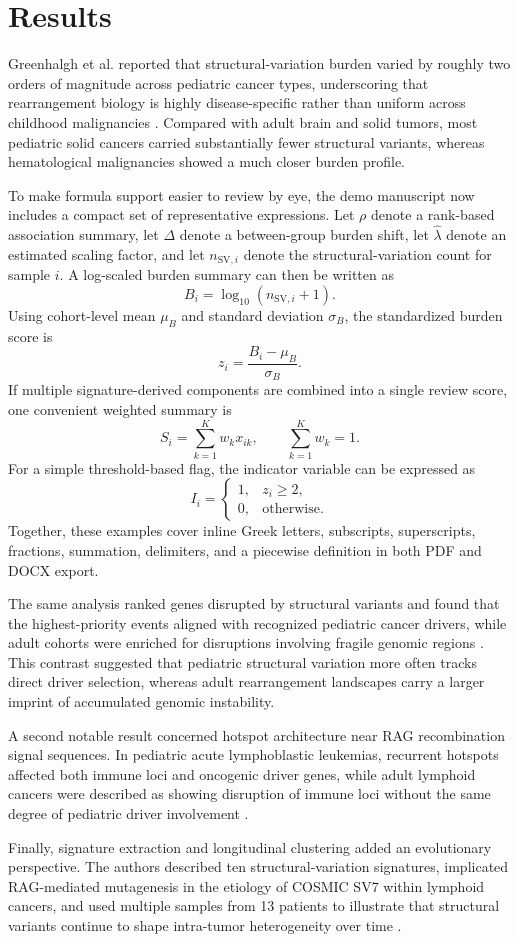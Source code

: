 \section{Results}
Greenhalgh et al. reported that structural-variation burden varied by
roughly two orders of magnitude across pediatric cancer types,
underscoring that rearrangement biology is highly disease-specific
rather than uniform across childhood malignancies \supercite{Greenhalgh_2026}.
Compared with adult brain and solid tumors, most pediatric solid cancers
carried substantially fewer structural variants, whereas hematological
malignancies showed a much closer burden profile.

To make formula support easier to review by eye, the demo manuscript now
includes a compact set of representative expressions. Let $\rho$ denote
a rank-based association summary, let $\Delta$ denote a between-group
burden shift, let $\hat{\lambda}$ denote an estimated scaling factor,
and let $n_{\mathrm{SV},i}$ denote the structural-variation count for
sample $i$. A log-scaled burden summary can then be written as
\[
B_i = \log_{10}\!\left(n_{\mathrm{SV},i} + 1\right).
\]
Using cohort-level mean $\mu_B$ and standard deviation $\sigma_B$, the
standardized burden score is
\[
z_i = \frac{B_i - \mu_B}{\sigma_B}.
\]
If multiple signature-derived components are combined into a single
review score, one convenient weighted summary is
\[
S_i = \sum_{k=1}^{K} w_k x_{ik},
\qquad
\sum_{k=1}^{K} w_k = 1.
\]
For a simple threshold-based flag, the indicator variable can be
expressed as
\[
I_i =
\left\{
\begin{array}{ll}
1, & z_i \geq 2, \\
0, & \mathrm{otherwise}.
\end{array}
\right.
\]
Together, these examples cover inline Greek letters, subscripts,
superscripts, fractions, summation, delimiters, and a piecewise
definition in both PDF and DOCX export.

The same analysis ranked genes disrupted by structural variants and
found that the highest-priority events aligned with recognized pediatric
cancer drivers, while adult cohorts were enriched for disruptions
involving fragile genomic regions \supercite{Greenhalgh_2026}. This contrast suggested
that pediatric structural variation more often tracks direct driver
selection, whereas adult rearrangement landscapes carry a larger imprint
of accumulated genomic instability.

A second notable result concerned hotspot architecture near RAG
recombination signal sequences. In pediatric acute lymphoblastic
leukemias, recurrent hotspots affected both immune loci and oncogenic
driver genes, while adult lymphoid cancers were described as showing
disruption of immune loci without the same degree of pediatric driver
involvement \supercite{Greenhalgh_2026}.

Finally, signature extraction and longitudinal clustering added an
evolutionary perspective. The authors described ten structural-variation
signatures, implicated RAG-mediated mutagenesis in the etiology of
COSMIC SV7 within lymphoid cancers, and used multiple samples from 13
patients to illustrate that structural variants continue to shape
intra-tumor heterogeneity over time \supercite{Greenhalgh_2026}.
